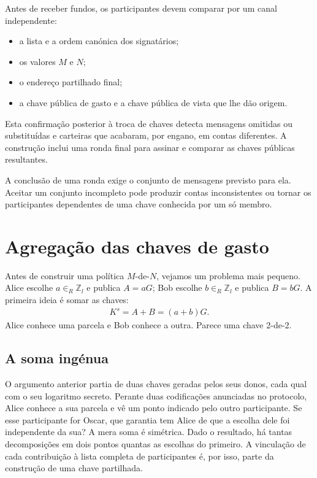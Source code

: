 Antes de receber fundos, os
participantes devem comparar por um canal independente:
\begin{itemize}
 \item a lista e a ordem canónica dos signatários;
 \item os valores \(M\) e \(N\);
 \item o endereço partilhado final;
 \item a chave pública de gasto e a chave pública de vista que lhe dão origem.
\end{itemize}
Esta confirmação posterior à troca de chaves detecta mensagens omitidas ou
substituídas e carteiras que acabaram, por engano, em contas diferentes. A
construção inclui uma ronda final para assinar e comparar as
chaves públicas resultantes.

A conclusão de uma ronda exige o conjunto de mensagens previsto para ela.
Aceitar um conjunto incompleto pode produzir contas inconsistentes ou tornar
os participantes dependentes de uma chave conhecida por um só membro.

\section{Agregação das chaves de gasto}
\label{sec:key-aggregation}

Antes de construir uma política \(M\)-de-\(N\), vejamos um problema mais
pequeno. Alice escolhe \(a\in_R\mathbb Z_l\) e publica \(A=aG\); Bob escolhe
\(b\in_R\mathbb Z_l\) e publica \(B=bG\). A primeira ideia é somar as chaves:
\begin{align*}
 K^s=A+B=(a+b)G.
\end{align*}
Alice conhece uma parcela e Bob conhece a outra. Parece uma chave 2-de-2.

\subsection{A soma ingénua}
\label{sec:naive-key-aggregation}
\label{subsec:drawbacks-naive-aggregation-cancellation}

O argumento anterior partia de duas chaves geradas pelos seus donos,
cada qual com o seu logaritmo secreto. Perante duas codificações
anunciadas no protocolo, Alice conhece a sua parcela e vê um ponto
indicado pelo outro participante. Se esse participante for Oscar,
que garantia tem Alice de que a escolha dele foi independente da
sua? A mera soma é simétrica. Dado o resultado, há tantas
decomposições em dois pontos quantas as escolhas do primeiro.
A vinculação de cada contribuição à lista completa de participantes
é, por isso, parte da construção de uma chave partilhada.

